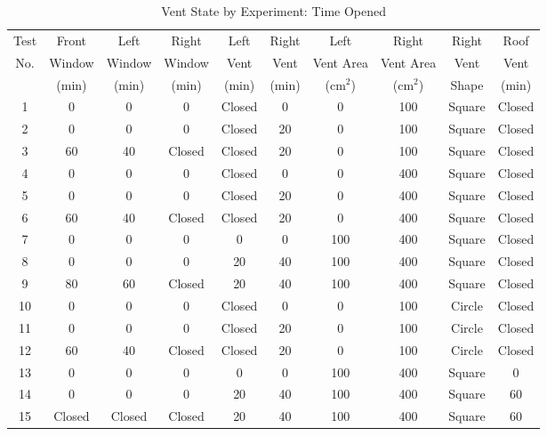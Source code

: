 \begin{table}[h!]
\caption{Vent State by Experiment: Time Opened}
\begin{center}
\begin{tabular}{|c|c|c|c|c|c|c|c|c|c|}
\hline
Test & Front    & Left    & Right     & Left     & Right   & Left         & Right        & Right   & Roof    \\
No.  & Window   & Window  & Window    & Vent     & Vent    & Vent Area    & Vent Area    & Vent    & Vent    \\
     & (min)    & (min)   & (min)     & (min)    & (min)   & (cm$^2$)     & (cm$^2$)     & Shape   & (min)   \\ \hline \hline
1    & 0        &  0      &  0        &  Closed  &  0      &  0           &  100         &  Square & Closed  \\ \hline
2    & 0        &  0      &  0        &  Closed  &  20     &  0           &  100         &  Square & Closed  \\ \hline
3    & 60       &  40     &  Closed   &  Closed  &  20     &  0           &  100         &  Square & Closed  \\ \hline
4    & 0        &  0      &  0        &  Closed  &  0      &  0           & 400          &  Square & Closed  \\ \hline
5    & 0        &  0      &  0        &  Closed  &  20     &  0           &  400         &  Square & Closed  \\ \hline
6    & 60       &  40     &  Closed   &  Closed  &  20     &  0           &  400         &  Square & Closed  \\ \hline
7    &  0       &  0      &  0        &  0       &  0      &  100         &  400         &  Square & Closed  \\ \hline
8    &  0       &  0      &  0        &  20      &  40     &  100         &  400         &  Square & Closed  \\ \hline
9    &  80      &  60     &  Closed   &  20      &  40     &  100         &  400         &  Square & Closed  \\ \hline
10   &  0       &  0      &  0        &  Closed  &  0      &  0           &  100         & Circle  & Closed  \\ \hline
11   &  0       &  0      &  0        &  Closed  &  20     &  0           &  100         & Circle  & Closed  \\ \hline
12   &  60      &  40     &  Closed   &  Closed  &  20     &  0           &  100         & Circle  & Closed  \\ \hline
13   &  0       &  0      &  0        &  0       &  0      &  100         &  400         &  Square & 0       \\ \hline
14   &  0       &  0      &  0        &  20      &  40     &  100         &  400         &  Square & 60      \\ \hline
15   &  Closed  & Closed  &  Closed   &  20      &  40     &  100         &  400         &  Square & 60      \\ \hline
\end{tabular}
\end{center}
\label{tab:NIST_Vent_Study}
\end{table}


